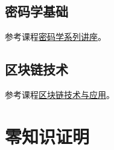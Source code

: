 \documentclass[10pt]{ctexart}
\newtheorem{definition}{定义}
\begin{document}
\subsection{密码学基础}
参考课程\href{https://www.bilibili.com/video/BV18T411k74f/?spm_id_from=333.788&vd_source=c6586ed2410fae637f393017e00f4845}{密码学系列讲座}。
\subsection{区块链技术}
参考课程\href{http://zhenxiao.com/blockchain/}{区块链技术与应用}。
\section{零知识证明}
		 
		

\end{document}

